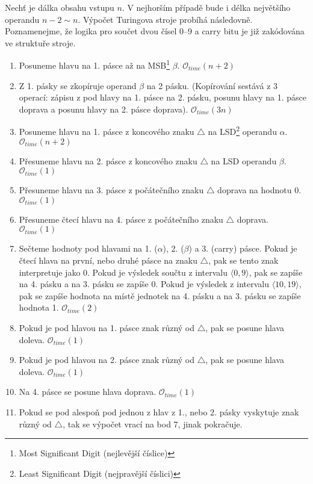 \documentclass[a4paper, 11pt, fleqn]{scrartcl}
\begin{document}
   Nechť je dálka obsahu vstupu $n$. V nejhorším případě bude i délka největšího operandu $n-2 \sim n$. Výpočet Turingova stroje probíhá následovně. Poznamenejme, že logika pro součet dvou čísel 0--9 a carry bitu je již zakódována ve struktuře stroje.
   \begin{enumerate}\setlength\itemsep{-0.1em}
     \item Posuneme hlavu na 1. pásce až na MSB\footnote{Most Significant Digit (nejlevější číslice)} $\beta$. $\mathcal{O}_{time}(n + 2)$
     \item Z 1. pásky se zkopíruje operand $\beta$ na 2 pásku. (Kopírování sestává z 3 operací: zápisu z pod hlavy na 1. pásce na 2. pásku, posunu hlavy na 1. pásce doprava a posunu hlavy na 2. pásce doprava). $\mathcal{O}_{time}(3n)$
     \item Posuneme hlavu na 1. pásce z koncového znaku $\triangle$ na LSD\footnote{Least Significant Digit (nejpravější číslici)} operandu $\alpha$. $\mathcal{O}_{time}(n + 2)$
     \item Přesuneme hlavu na 2. pásce z koncového znaku $\triangle$ na LSD operandu $\beta$. $\mathcal{O}_{time}(1)$
     \item Přesuneme hlavu na 3. pásce z počátečního znaku $\triangle$ doprava na hodnotu 0. $\mathcal{O}_{time}(1)$
     \item Přesuneme čtecí hlavu na 4. pásce z počátečního znaku $\triangle$ doprava. $\mathcal{O}_{time}(1)$
     \item Sečteme hodnoty pod hlavami na 1. ($\alpha$), 2. ($\beta$) a 3. (carry) pásce. Pokud je čtecí hlava na první, nebo druhé pásce na znaku $\triangle$, pak se tento znak interpretuje jako 0. Pokud je výsledek součtu z intervalu $\langle 0,9 \rangle$, pak se zapíše na 4. pásku a na 3. pásku se zapíše 0. Pokud je výsledek z intervalu $\langle 10, 19\rangle$, pak se zapíše hodnota na místě jednotek na 4. pásku a na 3. pásku se zapíše hodnota 1. $\mathcal{O}_{time}(2)$
     \item Pokud je pod hlavou na 1. pásce znak různý od $\triangle$, pak se posune hlava doleva. $\mathcal{O}_{time}(1)$
     \item Pokud je pod hlavou na 2. pásce znak různý od $\triangle$, pak se posune hlava doleva. $\mathcal{O}_{time}(1)$
     \item Na 4. pásce se posune hlava doprava. $\mathcal{O}_{time}(1)$
     \item Pokud se pod alespoň pod jednou z hlav z 1., nebo 2. pásky vyskytuje znak různý od $\triangle$, tak se výpočet vrací na bod 7, jinak pokračuje.

\end{enumerate}
\end{document}
